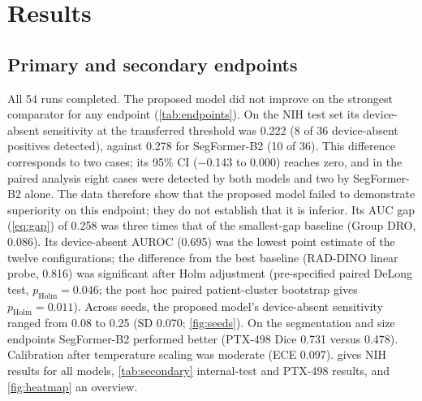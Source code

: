 \documentclass{ieeeaccess}
\begin{document}
\section{Results}
\label{sec:results}

\subsection{Primary and secondary endpoints}
\label{sec:res-endpoints}
All 54 runs completed. The proposed model did not improve on the strongest comparator for any endpoint (\cref{tab:endpoints}). On the NIH test set its device-absent sensitivity at the transferred threshold was 0.222 (8 of 36 device-absent positives detected), against 0.278 for SegFormer-B2 (10 of 36). This difference corresponds to two cases; its 95\% CI ($-$0.143 to 0.000) reaches zero, and in the paired analysis eight cases were detected by both models and two by SegFormer-B2 alone. The data therefore show that the proposed model failed to demonstrate superiority on this endpoint; they do not establish that it is inferior. Its AUC gap (\cref{eq:gap}) of 0.258 was three times that of the smallest-gap baseline (Group DRO, 0.086). Its device-absent AUROC (0.695) was the lowest point estimate of the twelve configurations; the difference from the best baseline (RAD-DINO linear probe, 0.816) was significant after Holm adjustment (pre-specified paired DeLong test, $p_\text{Holm}=0.046$; the post hoc paired patient-cluster bootstrap gives $p_\text{Holm}=0.011$). Across seeds, the proposed model's device-absent sensitivity ranged from 0.08 to 0.25 (SD 0.070; \cref{fig:seeds}). On the segmentation and size endpoints SegFormer-B2 performed better (PTX-498 Dice 0.731 versus 0.478). Calibration after temperature scaling was moderate (ECE 0.097).  gives NIH results for all models, \cref{tab:secondary} internal-test and PTX-498 results, and \cref{fig:heatmap} an overview.
\end{document}
